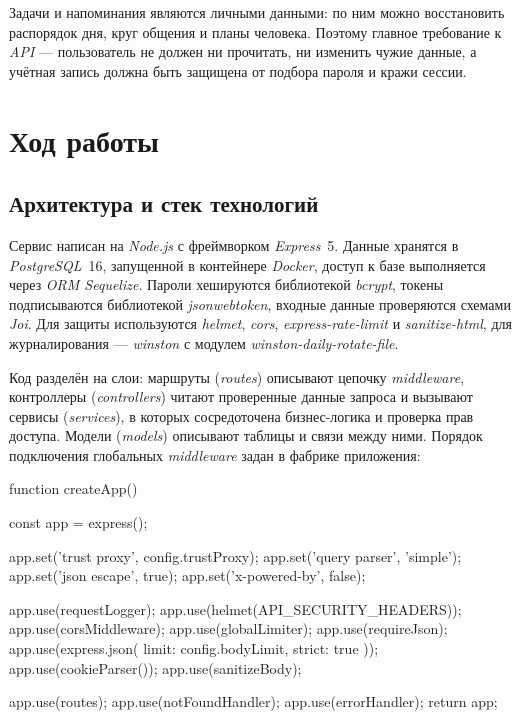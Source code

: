 \documentclass{stp}
\begin{document}
Задачи и напоминания являются личными данными: по ним можно восстановить
распорядок дня, круг общения и планы человека. Поэтому главное
требование к \textit{API} — пользователь не должен ни прочитать, ни изменить
чужие данные, а учётная запись должна быть защищена от подбора пароля и
кражи сессии.

\section{Ход работы}\label{sec:work}

\subsection{Архитектура и стек технологий}

Сервис написан на \textit{Node.js} с фреймворком \textit{Express}~5. Данные хранятся в
\textit{PostgreSQL}~16, запущенной в контейнере \textit{Docker}, доступ к базе выполняется
через \textit{ORM Sequelize}. Пароли хешируются библиотекой \textit{bcrypt}, токены
подписываются библиотекой \textit{jsonwebtoken}, входные данные проверяются
схемами \textit{Joi}. Для защиты используются \textit{helmet}, \textit{cors}, \textit{express-rate-limit} и
\textit{sanitize-html}, для журналирования — \textit{winston} с модулем
\textit{winston-daily-rotate-file}.

Код разделён на слои: маршруты (\textit{routes}) описывают цепочку \textit{middleware},
контроллеры (\textit{controllers}) читают проверенные данные запроса и вызывают
сервисы (\textit{services}), в которых сосредоточена бизнес-логика и проверка
прав доступа. Модели (\textit{models}) описывают таблицы и связи между ними.
Порядок подключения глобальных \textit{middleware} задан в фабрике приложения:

\begin{stplisting}
function createApp() {
  const app = express();

  app.set('trust proxy', config.trustProxy);
  app.set('query parser', 'simple');
  app.set('json escape', true);
  app.set('x-powered-by', false);

  app.use(requestLogger);
  app.use(helmet(API_SECURITY_HEADERS));
  app.use(corsMiddleware);
  app.use(globalLimiter);
  app.use(requireJson);
  app.use(express.json({ limit: config.bodyLimit,
    strict: true }));
  app.use(cookieParser());
  app.use(sanitizeBody);

  app.use(routes);
  app.use(notFoundHandler);
  app.use(errorHandler);
  return app;
}
\end{stplisting}
\end{document}
